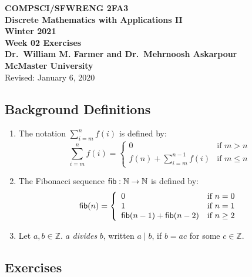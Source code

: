 \documentclass[11pt,fleqn]{article}
\newcommand{\bc}{\begin{center}}
\newcommand{\ec}{\end{center}}
\newcommand{\mname}[1]{\mbox{\sf #1}}
\begin{document}

\bc

  {\large \textbf{COMPSCI/SFWRENG 2FA3}}\\[2mm]
  {\large \textbf{Discrete Mathematics with Applications II}}\\[2mm]
  {\large \textbf{Winter 2021}}\\[8mm]
  {\huge \textbf{Week 02 Exercises}}\\[6mm]
  {\large \textbf{Dr.~William M. Farmer and Dr.~Mehrnoosh Askarpour}}\\[2mm]
  {\large \textbf{McMaster University}}\\[6mm]
  {\large Revised: January 6, 2020}

\ec

\medskip

\subsection*{Background Definitions}

\begin{enumerate}

  \item The notation $\sum^{n}_{i=m}f(i)$ is defined by: 
    \[\sum^{n}_{i=m}f(i) =
      \left\{\begin{array}{ll}
               0                          & \textrm{if } m > n\\
               f(n) + \sum^{n-1}_{i=m}f(i) & \textrm{if } m \le n
             \end{array}
      \right.\] 

  \item The Fibonacci sequence $\mname{fib} : \mathbb{N} \rightarrow
    \mathbb{N}$ is defined by:
    \[\mname{fib}(n) = 
      \left\{\begin{array}{ll}
               0 & \textrm{if } n = 0 \\
               1 & \textrm{if } n = 1 \\
               \mname{fib}(n-1) + \mname{fib}(n-2) & \textrm{if } n \ge 2
             \end{array}
      \right.\]

   \item Let $a,b \in \mathbb{Z}$.  $a$ \emph{divides} $b$, written $a
     \mid b$, if $b = ac$ for some $c \in \mathbb{Z}$.

\end{enumerate}

\subsection*{Exercises}
\end{document}
